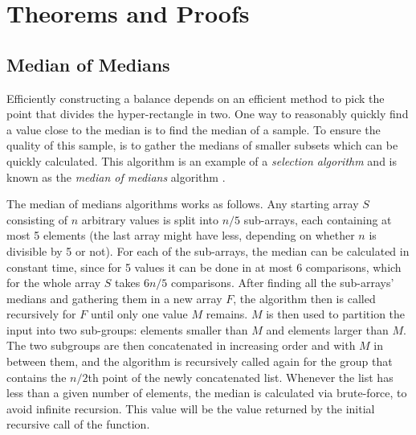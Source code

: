 \appendix
\chapter{Theorems and Proofs}
\label{chap:append}


\section{Median of Medians}
\label{median}
Efficiently constructing a balance \kdtree depends on an efficient method to pick the point that divides the hyper-rectangle in two. One way to reasonably quickly find a value close to the median is to find the median of a sample. To ensure the quality of this sample, is to gather the medians of smaller subsets which can be quickly calculated. This algorithm is an example of a \emph{selection algorithm} \cite{selection} and is known as the \emph{median of medians} algorithm \cite{medians}.

The median of medians algorithms works as follows. Any starting array $S$ consisting of $n$ arbitrary values is split into $n/5$ sub-arrays, each containing at most 5 elements (the last array might have less, depending on whether $n$ is divisible by 5 or not). For each of the sub-arrays, the median can be calculated in constant time, since for 5 values it can be done in at most 6 comparisons, which for the whole array $S$ takes $6n/5$ comparisons. After finding all the sub-arrays' medians and gathering them in a new array $F$, the algorithm then is called recursively for $F$ until only one value $M$ remains. $M$ is then used to partition the input into two sub-groups: elements smaller than $M$ and elements larger than $M$. The two subgroups are then concatenated in increasing order and with $M$ in between them, and the algorithm is recursively called again for the group that contains the $n/2$th point of the newly concatenated list. Whenever the list has less than a given number of elements, the median is calculated via brute-force, to avoid infinite recursion. This value will be the value returned by the initial recursive call of the function.

